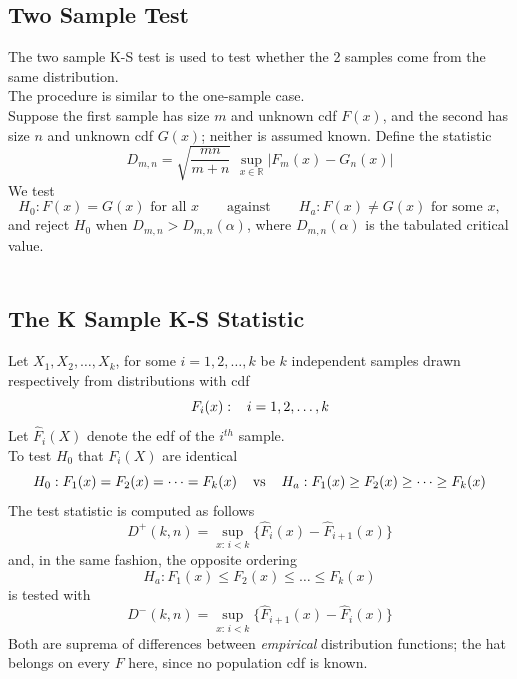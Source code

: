 \documentclass[11pt,a4paper]{article}
\theoremstyle{definition}
\begin{document}
\subsection{Two Sample Test}
The two sample K-S test is used to test whether the 2 samples come from the same distribution.\\ 
The procedure is similar to the one-sample case.\\ 
Suppose the first sample has size $m$ and unknown cdf $F(x)$, and the second has size $n$ and unknown cdf $G(x)$; neither is assumed known. Define the statistic $$D_{m,n}=\sqrt{\frac{mn}{m+n}}\,\,\sup_{x\in \mathbb{R}}|F_m(x)-G_n(x)|$$ 
We test
$$H_0: F(x)=G(x) \text{ for all } x
\qquad\text{against}\qquad
H_a: F(x)\neq G(x) \text{ for some } x,$$
and reject $H_0$ when $D_{m,n} > D_{m,n}(\alpha)$, where $D_{m,n}(\alpha)$ is the
tabulated critical value.\\\\








\subsection{The K Sample K-S Statistic}
Let $X_1,X_2,\dots,X_k$, for some $i=1,2,\dots,k$ be $k$ independent samples drawn respectively from distributions with cdf $$F_i(x):\hspace{0.3cm} i=1,2,\dots,k$$
Let $\widehat{F}_i(X)$ denote the edf of the $i^{th}$ sample.\\ 
To test $H_0$ that $F_i(X)$ are identical $$H_0:F_1(x)=F_2(x)=\dots=F_k(x)\hspace{0.4cm}\text{vs}\hspace{0.4cm} H_a:F_1(x)\geq F_2(x)\geq \dots \geq F_k(x)$$
The test statistic is computed as follows
$$D^+(k,n)=\sup_{x:\,i<k}\Big\{\widehat{F}_i(x)-\widehat{F}_{i+1}(x)\Big\}$$
and, in the same fashion, the opposite ordering
$$H_a:F_1(x)\leq F_2(x)\leq \dots \leq F_k(x)$$
is tested with
$$D^-(k,n)=\sup_{x:\,i<k}\Big\{\widehat{F}_{i+1}(x)-\widehat{F}_i(x)\Big\}$$
Both are suprema of differences between \emph{empirical} distribution functions;
the hat belongs on every $F$ here, since no population cdf is known.\\
\end{document}
